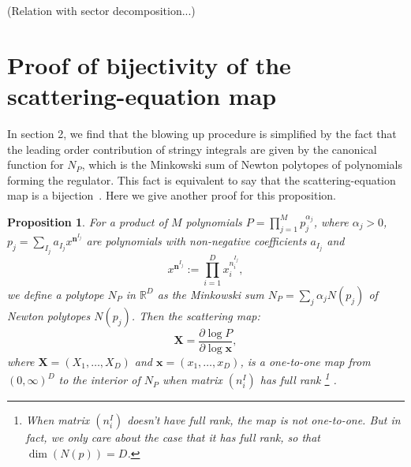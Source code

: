 \documentclass[12pt]{article}
\theoremstyle{definition}
\theoremstyle{plain}
\newtheorem*{pro*}{Proposition}
\begin{document}
(Relation with sector decomposition...)



\appendix

\section{Proof of bijectivity of the scattering-equation map}
In section 2, we find that the blowing up procedure is simplified by the fact that the leading order contribution of stringy integrals are given by the canonical function for $N_{P}$, which is the Minkowski sum of Newton polytopes of polynomials forming the regulator. This fact is equivalent to say that the scattering-equation map is a bijection~\cite{}. Here we give another proof for this proposition. 

\begin{pro*}
	For a product of $M$ polynomials $P=\prod_{j=1}^M p_j^{\alpha_j}$, 
	where $\alpha_j>0$, 
	$p_j=\sum_{I_{j}} a_{{I_j}} x^{\mathbf{n}^{I_j}}$ are polynomials with non-negative coefficients $a_{I_j}$ and
	\[
		x^{\mathbf{n}^{I_j}}:=\prod_{i=1}^D x_i^{n^{I_j}_i},
	\]
	we define a polytope $N_P$ in $\mathbb R^D$ as the Minkowski sum $N_P=\sum_j \alpha_j N(p_j)$ of Newton polytopes $N(p_j)$.
	Then the scattering map:
	\[
		\mathbf{X}=\frac{\partial \log P}{\partial \log \mathbf{x}},
	\]
	where $\mathbf{X}=(X_{1},\ldots,X_{D})$ and $\mathbf{x}=(x_{1},\ldots,x_{D})$, is a one-to-one map from $(0,\infty)^D$ to the interior of $N_P$ when matrix $(n_i^I)$ has full rank%
	\footnote{When matrix $(n_i^I)$ doesn't have full rank, the map is not one-to-one. 
		But in fact, we only care about the case that it has full rank, so that $\dim (N(p))=D$. 
		}%
		. 
	\end{pro*}
	
\end{document}
